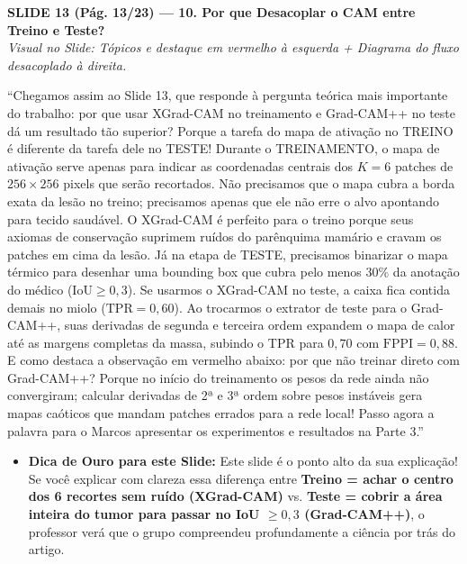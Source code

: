 \documentclass[11pt,a4paper]{article}
\newcommand{\slideheader}[3]{%
    \vspace{10pt}%
    \begin{tcolorbox}[colback=slateborder, colframe=slateborder, coltext=white, boxrule=0pt, arc=3pt, left=8pt, right=8pt, top=5pt, bottom=5pt]
        {\large\bfseries #1 — #2}\\[2pt]
        {\small\itshape Visual no Slide: #3}
    \end{tcolorbox}%
}
\newenvironment{falabox}{%
    \begin{tcolorbox}[colback=speechbg, colframe=speechborder, boxrule=1.2pt, arc=4pt, left=10pt, right=10pt, top=8pt, bottom=8pt, title={\bfseries O QUE VOCÊ DEVE FALAR (Fala Sugerida)}]%
}{%
    \end{tcolorbox}%
}
\newenvironment{explicabox}{%
    \begin{tcolorbox}[colback=explainbg, colframe=explainborder, boxrule=0.8pt, arc=4pt, left=10pt, right=10pt, top=8pt, bottom=8pt, title={\bfseries ENTENDA O QUE VOCÊ ESTÁ FALANDO (Explicação Didática de Cada Termo)}]%
}{%
    \end{tcolorbox}%
}
\begin{document}
\newpage
\slideheader{SLIDE 13 (Pág. 13/23)}{10. Por que Desacoplar o CAM entre Treino e Teste?}{Tópicos e destaque em vermelho à esquerda + Diagrama do fluxo desacoplado à direita.}

\begin{falabox}
``Chegamos assim ao Slide 13, que responde à pergunta teórica mais importante do trabalho: por que usar XGrad-CAM no treinamento e Grad-CAM++ no teste dá um resultado tão superior?
Porque a tarefa do mapa de ativação no TREINO é diferente da tarefa dele no TESTE!
Durante o TREINAMENTO, o mapa de ativação serve apenas para indicar as coordenadas centrais dos $K = 6$ patches de $256 \times 256$ pixels que serão recortados. Não precisamos que o mapa cubra a borda exata da lesão no treino; precisamos apenas que ele não erre o alvo apontando para tecido saudável. O XGrad-CAM é perfeito para o treino porque seus axiomas de conservação suprimem ruídos do parênquima mamário e cravam os patches em cima da lesão.
Já na etapa de TESTE, precisamos binarizar o mapa térmico para desenhar uma bounding box que cubra pelo menos 30\% da anotação do médico ($\text{IoU} \ge 0{,}3$). Se usarmos o XGrad-CAM no teste, a caixa fica contida demais no miolo ($\text{TPR} = 0{,}60$). Ao trocarmos o extrator de teste para o Grad-CAM++, suas derivadas de segunda e terceira ordem expandem o mapa de calor até as margens completas da massa, subindo o TPR para $0{,}70$ com $\text{FPPI} = 0{,}88$.
E como destaca a observação em vermelho abaixo: por que não treinar direto com Grad-CAM++? Porque no início do treinamento os pesos da rede ainda não convergiram; calcular derivadas de 2ª e 3ª ordem sobre pesos instáveis gera mapas caóticos que mandam patches errados para a rede local! Passo agora a palavra para o Marcos apresentar os experimentos e resultados na Parte 3.''
\end{falabox}

\begin{explicabox}
\begin{itemize}[leftmargin=*, itemsep=4pt]
    \item \textbf{Dica de Ouro para este Slide:} Este slide é o ponto alto da sua explicação! Se você explicar com clareza essa diferença entre \textbf{Treino = achar o centro dos 6 recortes sem ruído (XGrad-CAM)} vs. \textbf{Teste = cobrir a área inteira do tumor para passar no IoU $\ge 0{,}3$ (Grad-CAM++)}, o professor verá que o grupo compreendeu profundamente a ciência por trás do artigo.
\end{itemize}
\end{explicabox}
\end{document}
